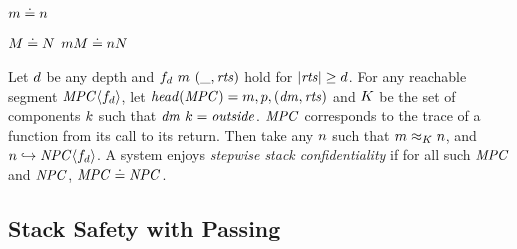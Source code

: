 \documentclass[acmsmall,review,anonymous]{acmart}\settopmatter{printfolios=true,printccs=false,printacmref=false}
\begin{document}
\begin{minipage}{.3\textwidth}
\judgment{}
         {\(m \doteq n\)}
\end{minipage}
\begin{minipage}{.6\textwidth}
\judgmenttwo{\(\mach, \head(\machT) \diamond \nach, \head(\nachT)\)}
            {\(M \doteq N\)}
            {\(m M \doteq n N\)}
\end{minipage}

 Let \(d\) be any depth and \(f_d ~ m ~ (\_, \mathit{rts})\) hold for
\(|\mathit{rts}| \geq d\). For any reachable segment \(\mathit{MPC} \langle f_d \rangle\),
let \(\mathit{head}(\mathit{MPC}) = m,p,(\mathit{dm},\mathit{rts})\) and
\(K\) be the set of components \(k\) such that \(\mathit{dm} ~ k = \mathit{outside}\).
\(\mathit{MPC}\) corresponds to the trace of a function from its call to its return.
Then take any \(n\) such that \(m \approx_K n\), and
\(n \hookrightarrow \mathit{NPC}\langle f_d \rangle\). A system enjoys
{\em stepwise stack confidentiality} if for all such \(\mathit{MPC}\) and \(\mathit{NPC}\),
\(\mathit{MPC} \doteq \mathit{NPC}\).

\subsection{Stack Safety with Passing}

\newcommand{\mainpassc}{magenta}
\end{document}

